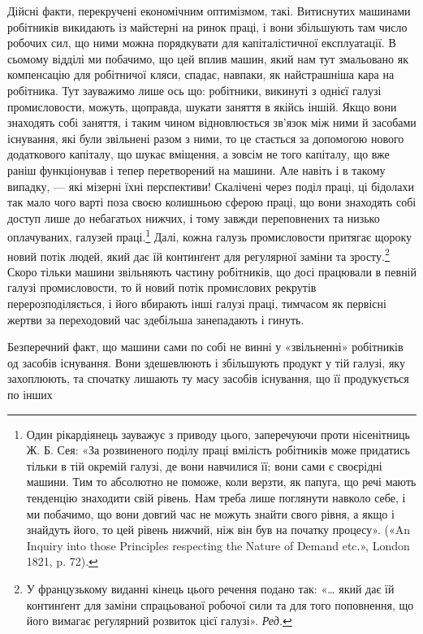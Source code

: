 Дійсні факти, перекручені економічним оптимізмом, такі.
Витиснутих машинами робітників викидають із майстерні на
ринок праці, і вони збільшують там число робочих сил, що ними
можна порядкувати для капіталістичної експлуатації. В сьомому
відділі ми побачимо, що цей вплив машин, який нам тут змальовано
як компенсацію для робітничої кляси, спадає, навпаки, як
найстрашніша кара на робітника. Тут зауважимо лише ось
що: робітники, викинуті з однієї галузі промисловости, можуть,
щоправда, шукати заняття в якійсь іншій. Якщо вони знаходять
собі заняття, і таким чином відновлюється зв’язок між ними й
засобами існування, які були звільнені разом з ними, то це
стається за допомогою нового додаткового капіталу, що шукає
вміщення, а зовсім не того капіталу, що вже раніш функціонував
і тепер перетворений на машини. Але навіть і в такому випадку,
— які мізерні їхні перспективи! Скалічені через поділ праці,
ці бідолахи так мало чого варті поза своєю колишньою сферою
праці, що вони знаходять собі доступ лише до небагатьох нижчих,
і тому завжди переповнених та низько оплачуваних, галузей
праці.\footnote{
Один рікардіянець зауважує з приводу цього, заперечуючи проти
нісенітниць Ж. Б. Сея: «За розвиненого поділу праці вмілість робітників
може придатись тільки в тій окремій галузі, де вони навчилися її; вони
сами є своєрідні машини. Тим то абсолютно не поможе, коли верзти, як
папуга, що речі мають тенденцію знаходити свій рівень. Нам треба лише
поглянути навколо себе, і ми побачимо, що вони довгий час не можуть
знайти свого рівня, а якщо і знайдуть його, то цей рівень нижчий, ніж
він був на початку процесу». («An Inquiry into those Principles respecting
the Nature of Demand etc.», London 1821, p. 72).
} Далі, кожна галузь промисловости притягає щороку
новий потік людей, який дає їй континґент для регулярної заміни
та зросту.\footnote*{
У французькому виданні кінець цього речення подано так: «\dots{} який
дає їй континґент для заміни спрацьованої робочої сили та для того поповнення,
що його вимагає реґулярний розвиток цієї галузі». \emph{Ред.}
} Скоро тільки машини звільняють частину робітників,
що досі працювали в певній галузі промисловости, то й новий
потік промислових рекрутів перерозподіляється, і його вбирають
інші галузі праці, тимчасом як первісні жертви за переходовий
час здебільша занепадають і гинуть.

Безперечний факт, що машини сами по собі не винні у «звільненні»
робітників од засобів існування. Вони здешевлюють і
збільшують продукт у тій галузі, яку захоплюють, та спочатку
лишають ту масу засобів існування, що її продукується по інших
\parbreak{}  %
